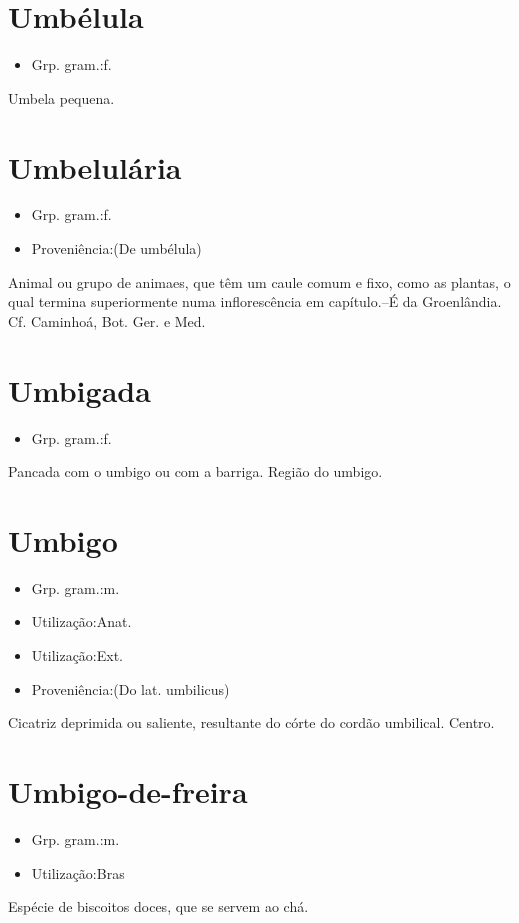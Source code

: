 \documentclass{article}
\begin{document}
\section{Umbélula}
\begin{itemize}
\item {Grp. gram.:f.}
\end{itemize}
Umbela pequena.
\section{Umbelulária}
\begin{itemize}
\item {Grp. gram.:f.}
\end{itemize}
\begin{itemize}
\item {Proveniência:(De \textunderscore umbélula\textunderscore )}
\end{itemize}
Animal ou grupo de animaes, que têm um caule comum e fixo, como as plantas, o qual termina superiormente numa inflorescência em capítulo.--É da Groenlândia. Cf. Caminhoá, \textunderscore Bot. Ger. e Med.\textunderscore 
\section{Umbigada}
\begin{itemize}
\item {Grp. gram.:f.}
\end{itemize}
Pancada com o umbigo ou com a barriga.
Região do umbigo.
\section{Umbigo}
\begin{itemize}
\item {Grp. gram.:m.}
\end{itemize}
\begin{itemize}
\item {Utilização:Anat.}
\end{itemize}
\begin{itemize}
\item {Utilização:Ext.}
\end{itemize}
\begin{itemize}
\item {Proveniência:(Do lat. \textunderscore umbilicus\textunderscore )}
\end{itemize}
Cicatriz deprimida ou saliente, resultante do córte do cordão umbilical.
Centro.
\section{Umbigo-de-freira}
\begin{itemize}
\item {Grp. gram.:m.}
\end{itemize}
\begin{itemize}
\item {Utilização:Bras}
\end{itemize}
Espécie de biscoitos doces, que se servem ao chá.
\end{document}
